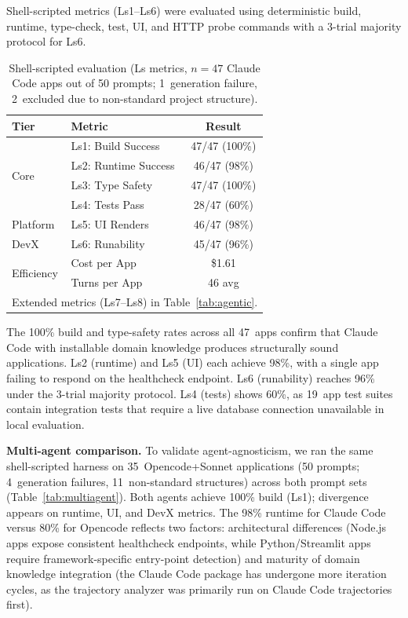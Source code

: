 \documentclass[sigconf,review]{acmart}
\begin{document}
Shell-scripted metrics (Ls1--Ls6) were evaluated using deterministic build, runtime, type-check, test, UI, and HTTP probe commands with a 3-trial majority protocol for Ls6.

\begin{table}[t]
\caption{Shell-scripted evaluation (Ls metrics, $n{=}47$ Claude Code apps out of 50 prompts; 1~generation failure, 2~excluded due to non-standard project structure).}
\label{tab:results}
\centering
\small
\begin{tabular}{llc}
\toprule
\textbf{Tier} & \textbf{Metric} & \textbf{Result} \\
\midrule
\multirow{4}{*}{Core} & Ls1: Build Success & 47/47 (100\%) \\
 & Ls2: Runtime Success & 46/47 (98\%) \\
 & Ls3: Type Safety & 47/47 (100\%) \\
 & Ls4: Tests Pass & 28/47 (60\%) \\
\midrule
Platform & Ls5: UI Renders & 46/47 (98\%) \\
\midrule
DevX & Ls6: Runability & 45/47 (96\%) \\
\midrule
\multirow{2}{*}{Efficiency} & Cost per App & \$1.61 \\
 & Turns per App & 46 avg \\
\bottomrule
\multicolumn{3}{l}{\scriptsize Extended metrics (Ls7--Ls8) in Table~\ref{tab:agentic}.}
\end{tabular}
\end{table}

The 100\% build and type-safety rates across all 47~apps confirm that Claude Code with installable domain knowledge produces structurally sound applications. Ls2 (runtime) and Ls5 (UI) each achieve 98\%, with a single app failing to respond on the healthcheck endpoint. Ls6 (runability) reaches 96\% under the 3-trial majority protocol. Ls4 (tests) shows 60\%, as 19~app test suites contain integration tests that require a live database connection unavailable in local evaluation.

\textbf{Multi-agent comparison.} To validate agent-agnosticism, we ran the same shell-scripted harness on 35~Opencode+Sonnet applications (50 prompts; 4~generation failures, 11~non-standard structures) across both prompt sets (Table~\ref{tab:multiagent}). Both agents achieve 100\% build (Ls1); divergence appears on runtime, UI, and DevX metrics. The 98\% runtime for Claude Code versus 80\% for Opencode reflects two factors: architectural differences (Node.js apps expose consistent healthcheck endpoints, while Python/Streamlit apps require framework-specific entry-point detection) and maturity of domain knowledge integration (the Claude Code package has undergone more iteration cycles, as the trajectory analyzer was primarily run on Claude Code trajectories first).
\end{document}
